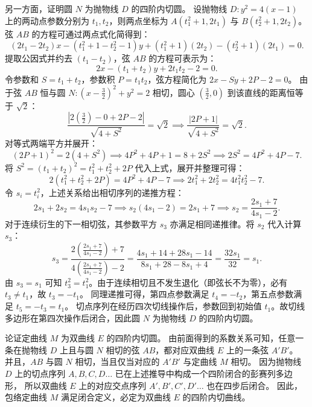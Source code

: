 \begin{solution}
另一方面，证明圆 $N$ 为抛物线 $D$ 的四阶内切圆。
设抛物线 $D: y^2 = 4(x - 1)$ 上的两动点参数分别为 $t_1, t_2$，则两点坐标为 $A(t_1^2 + 1, 2t_1)$ 与 $B(t_2^2 + 1, 2t_2)$。
弦 $AB$ 的方程可通过两点式化简得到：
\[ (2t_1 - 2t_2)x - (t_1^2 + 1 - t_2^2 - 1)y + (t_1^2 + 1)(2t_2) - (t_2^2 + 1)(2t_1) = 0. \]
提取公因式并约去 $(t_1 - t_2)$，弦 $AB$ 的方程可表示为：
\[ 2x - (t_1 + t_2)y + 2t_1 t_2 - 2 = 0. \]
令参数和 $S = t_1 + t_2$，参数积 $P = t_1 t_2$，弦方程简化为 $2x - Sy + 2P - 2 = 0$。
由于弦 $AB$ 恒与圆 $N: \left(x - \frac{3}{2}\right)^2 + y^2 = 2$ 相切，圆心 $\left(\frac{3}{2}, 0\right)$ 到该直线的距离恒等于 $\sqrt{2}$：
\[ \frac{\left|2\left(\frac{3}{2}\right) - 0 + 2P - 2\right|}{\sqrt{4 + S^2}} = \sqrt{2} \implies \frac{|2P + 1|}{\sqrt{4 + S^2}} = \sqrt{2}. \]
对等式两端平方并展开：
\[ (2P + 1)^2 = 2(4 + S^2) \implies 4P^2 + 4P + 1 = 8 + 2S^2 \implies 2S^2 = 4P^2 + 4P - 7. \]
将 $S^2 = (t_1 + t_2)^2 = t_1^2 + t_2^2 + 2P$ 代入上式，展开并整理可得：
\[ 2(t_1^2 + t_2^2 + 2P) = 4P^2 + 4P - 7 \implies 2t_1^2 + 2t_2^2 = 4t_1^2 t_2^2 - 7. \]
令 $s_i = t_i^2$，上述关系给出相切序列的递推方程：
\[ 2s_1 + 2s_2 = 4s_1 s_2 - 7 \implies s_2(4s_1 - 2) = 2s_1 + 7 \implies s_2 = \frac{2s_1 + 7}{4s_1 - 2}. \]
对于连续衍生的下一相切弦，其参数平方 $s_3$ 亦满足相同递推律。将 $s_2$ 代入计算 $s_3$：
\[ s_3 = \frac{2\left(\frac{2s_1 + 7}{4s_1 - 2}\right) + 7}{4\left(\frac{2s_1 + 7}{4s_1 - 2}\right) - 2} = \frac{4s_1 + 14 + 28s_1 - 14}{8s_1 + 28 - 8s_1 + 4} = \frac{32s_1}{32} = s_1. \]
由 $s_3 = s_1$ 可知 $t_3^2 = t_1^2$。由于连续相切且不发生退化（即弦长不为零），必有 $t_3 \neq t_1$，故 $t_3 = -t_1$。
同理递推可得，第四点参数满足 $t_4 = -t_2$，第五点参数满足 $t_5 = -t_3 = t_1$。
切点序列在经历四次切线操作后，参数回到初始值 $t_1$。故切线多边形在第四次操作后闭合，因此圆 $N$ 为抛物线 $D$ 的四阶内切圆。

论证定曲线 $M$ 为双曲线 $E$ 的四阶内切圆。
由前面得到的系数关系可知，任意一条在抛物线 $D$ 上且与圆 $N$ 相切的弦 $AB$，都对应双曲线 $E$ 上的一条弦 $A'B'$。
并且，$AB$ 与圆 $N$ 相切，当且仅当对应的 $A'B'$ 与定曲线 $M$ 相切。
因为抛物线 $D$ 上的切点序列 $A, B, C, D \dots$ 已在上述推导中构成一个四阶闭合的彭赛列多边形，
所以双曲线 $E$ 上的对应交点序列 $A', B', C', D' \dots$ 也在四步后闭合。
因此，包络定曲线 $M$ 满足闭合定义，必定为双曲线 $E$ 的四阶内切曲线。
\end{solution}

